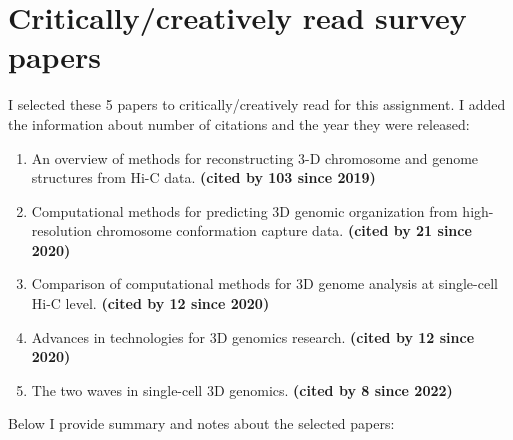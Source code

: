 \section{Critically/creatively read survey papers}

I selected these 5 papers to critically/creatively read for this assignment. I added the information about number of citations and the year they were released:
\begin{enumerate}
    \item \cite{oluwadare2019overview} An overview of methods for reconstructing 3-D chromosome and genome structures from Hi-C data. \textbf{(cited by 103 since 2019)}
    \item \cite{mackay2020computational} Computational methods for predicting 3D genomic organization from high-resolution chromosome conformation capture data. \textbf{(cited by 21 since 2020)}
    \item \cite{li2020comparison} Comparison of computational methods for 3D genome analysis at single-cell Hi-C level. \textbf{(cited by 12 since 2020)}
    \item \cite{zhang2020advances} Advances in technologies for 3D genomics research. \textbf{(cited by 12 since 2020)}
    \item \cite{ulianov2022two} The two waves in single-cell 3D genomics. \textbf{(cited by 8 since 2022)}
\end{enumerate}

Below I provide summary and notes about the selected papers:

